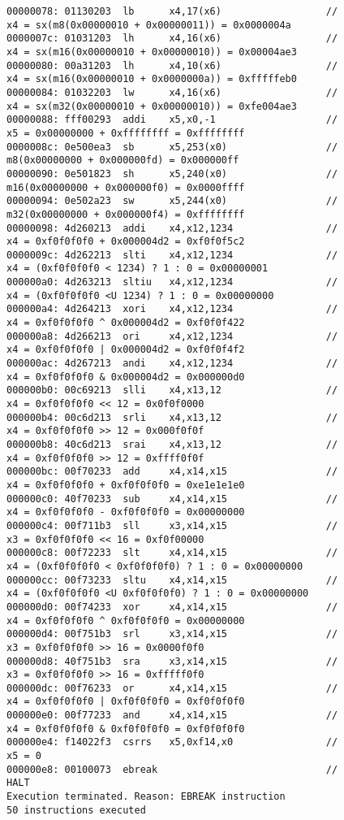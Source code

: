 \documentclass{article}
\begin{document}
\begin{figure}[ht]
\begin{minipage}{\textwidth}
{\begin{verbatim}
00000078: 01130203  lb      x4,17(x6)                  // x4 = sx(m8(0x00000010 + 0x00000011)) = 0x0000004a
0000007c: 01031203  lh      x4,16(x6)                  // x4 = sx(m16(0x00000010 + 0x00000010)) = 0x00004ae3
00000080: 00a31203  lh      x4,10(x6)                  // x4 = sx(m16(0x00000010 + 0x0000000a)) = 0xfffffeb0
00000084: 01032203  lw      x4,16(x6)                  // x4 = sx(m32(0x00000010 + 0x00000010)) = 0xfe004ae3
00000088: fff00293  addi    x5,x0,-1                   // x5 = 0x00000000 + 0xffffffff = 0xffffffff
0000008c: 0e500ea3  sb      x5,253(x0)                 // m8(0x00000000 + 0x000000fd) = 0x000000ff
00000090: 0e501823  sh      x5,240(x0)                 // m16(0x00000000 + 0x000000f0) = 0x0000ffff
00000094: 0e502a23  sw      x5,244(x0)                 // m32(0x00000000 + 0x000000f4) = 0xffffffff
00000098: 4d260213  addi    x4,x12,1234                // x4 = 0xf0f0f0f0 + 0x000004d2 = 0xf0f0f5c2
0000009c: 4d262213  slti    x4,x12,1234                // x4 = (0xf0f0f0f0 < 1234) ? 1 : 0 = 0x00000001
000000a0: 4d263213  sltiu   x4,x12,1234                // x4 = (0xf0f0f0f0 <U 1234) ? 1 : 0 = 0x00000000
000000a4: 4d264213  xori    x4,x12,1234                // x4 = 0xf0f0f0f0 ^ 0x000004d2 = 0xf0f0f422
000000a8: 4d266213  ori     x4,x12,1234                // x4 = 0xf0f0f0f0 | 0x000004d2 = 0xf0f0f4f2
000000ac: 4d267213  andi    x4,x12,1234                // x4 = 0xf0f0f0f0 & 0x000004d2 = 0x000000d0
000000b0: 00c69213  slli    x4,x13,12                  // x4 = 0xf0f0f0f0 << 12 = 0x0f0f0000
000000b4: 00c6d213  srli    x4,x13,12                  // x4 = 0xf0f0f0f0 >> 12 = 0x000f0f0f
000000b8: 40c6d213  srai    x4,x13,12                  // x4 = 0xf0f0f0f0 >> 12 = 0xffff0f0f
000000bc: 00f70233  add     x4,x14,x15                 // x4 = 0xf0f0f0f0 + 0xf0f0f0f0 = 0xe1e1e1e0
000000c0: 40f70233  sub     x4,x14,x15                 // x4 = 0xf0f0f0f0 - 0xf0f0f0f0 = 0x00000000
000000c4: 00f711b3  sll     x3,x14,x15                 // x3 = 0xf0f0f0f0 << 16 = 0xf0f00000
000000c8: 00f72233  slt     x4,x14,x15                 // x4 = (0xf0f0f0f0 < 0xf0f0f0f0) ? 1 : 0 = 0x00000000
000000cc: 00f73233  sltu    x4,x14,x15                 // x4 = (0xf0f0f0f0 <U 0xf0f0f0f0) ? 1 : 0 = 0x00000000
000000d0: 00f74233  xor     x4,x14,x15                 // x4 = 0xf0f0f0f0 ^ 0xf0f0f0f0 = 0x00000000
000000d4: 00f751b3  srl     x3,x14,x15                 // x3 = 0xf0f0f0f0 >> 16 = 0x0000f0f0
000000d8: 40f751b3  sra     x3,x14,x15                 // x3 = 0xf0f0f0f0 >> 16 = 0xfffff0f0
000000dc: 00f76233  or      x4,x14,x15                 // x4 = 0xf0f0f0f0 | 0xf0f0f0f0 = 0xf0f0f0f0
000000e0: 00f77233  and     x4,x14,x15                 // x4 = 0xf0f0f0f0 & 0xf0f0f0f0 = 0xf0f0f0f0
000000e4: f14022f3  csrrs   x5,0xf14,x0                // x5 = 0
000000e8: 00100073  ebreak                             // HALT
Execution terminated. Reason: EBREAK instruction
50 instructions executed
\end{verbatim}
}\end{minipage}
\label{exec.operation.format}
\end{figure}
\end{document}
